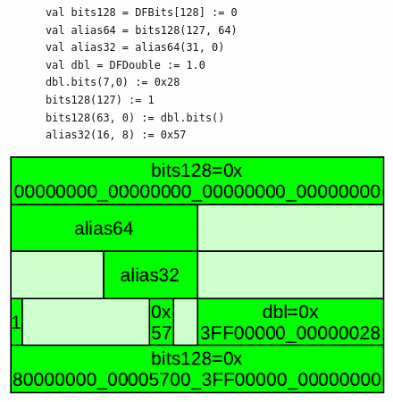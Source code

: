 \begin{figure}[h]
  \centering
  \begin{minipage}[b][3cm][b]{0.57\linewidth}
    \vfill
    \begin{verbatim}
      val bits128 = DFBits[128] := 0
      val alias64 = bits128(127, 64)
      val alias32 = alias64(31, 0)
      val dbl = DFDouble := 1.0
      dbl.bits(7,0) := 0x28
      bits128(127) := 1
      bits128(63, 0) := dbl.bits()
      alias32(16, 8) := 0x57		    
    \end{verbatim}
    \vfill
  \end{minipage}%
  \hfill
  \begin{minipage}[b][3cm][b]{0.40\linewidth}
    \centering
    \vfill
		\includegraphics[width=\linewidth]{graphics/Aliasing.pdf} 
    \vfill
  \end{minipage}
  \label{fig:Aliasing}
\end{figure}

